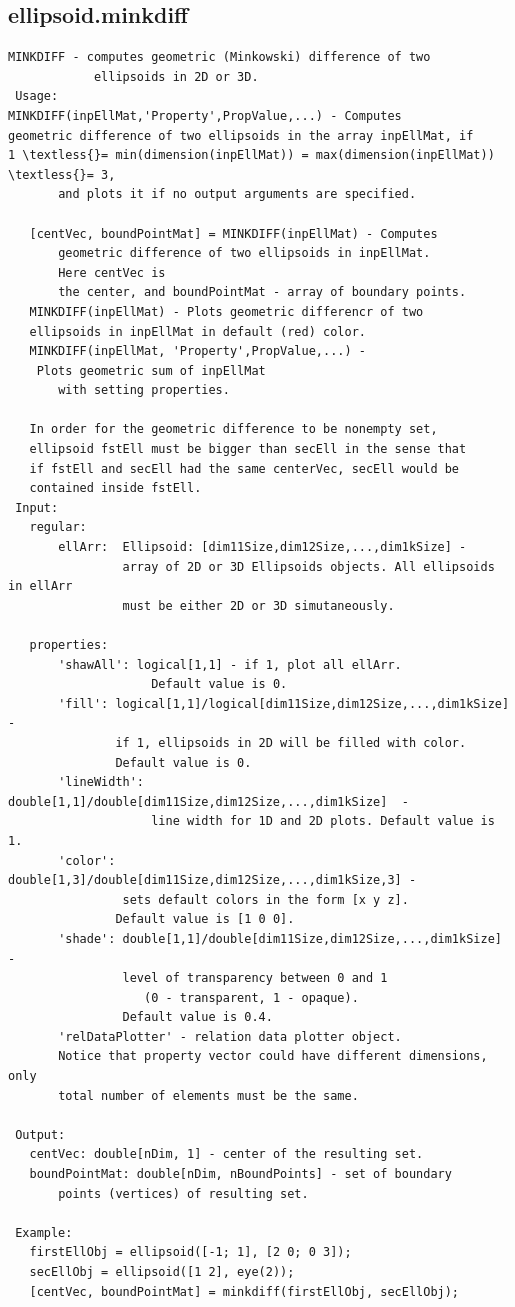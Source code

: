 \documentclass[letterpaper,10pt,english]{sphinxmanual}
\begin{document}
\subsection{ellipsoid.minkdiff}
\label{chap_functions:ellipsoid-minkdiff}
\begin{Verbatim}[commandchars=\\\{\}]
MINKDIFF - computes geometric (Minkowski) difference of two
            ellipsoids in 2D or 3D.
 Usage:
MINKDIFF(inpEllMat,'Property',PropValue,...) - Computes
geometric difference of two ellipsoids in the array inpEllMat, if
1 \textless{}= min(dimension(inpEllMat)) = max(dimension(inpEllMat)) \textless{}= 3,
       and plots it if no output arguments are specified.

   [centVec, boundPointMat] = MINKDIFF(inpEllMat) - Computes
       geometric difference of two ellipsoids in inpEllMat.
       Here centVec is
       the center, and boundPointMat - array of boundary points.
   MINKDIFF(inpEllMat) - Plots geometric differencr of two
   ellipsoids in inpEllMat in default (red) color.
   MINKDIFF(inpEllMat, 'Property',PropValue,...) -
    Plots geometric sum of inpEllMat
       with setting properties.

   In order for the geometric difference to be nonempty set,
   ellipsoid fstEll must be bigger than secEll in the sense that
   if fstEll and secEll had the same centerVec, secEll would be
   contained inside fstEll.
 Input:
   regular:
       ellArr:  Ellipsoid: [dim11Size,dim12Size,...,dim1kSize] -
                array of 2D or 3D Ellipsoids objects. All ellipsoids in ellArr
                must be either 2D or 3D simutaneously.

   properties:
       'shawAll': logical[1,1] - if 1, plot all ellArr.
                    Default value is 0.
       'fill': logical[1,1]/logical[dim11Size,dim12Size,...,dim1kSize]  -
               if 1, ellipsoids in 2D will be filled with color.
               Default value is 0.
       'lineWidth': double[1,1]/double[dim11Size,dim12Size,...,dim1kSize]  -
                    line width for 1D and 2D plots. Default value is 1.
       'color': double[1,3]/double[dim11Size,dim12Size,...,dim1kSize,3] -
                sets default colors in the form [x y z].
               Default value is [1 0 0].
       'shade': double[1,1]/double[dim11Size,dim12Size,...,dim1kSize]  -
                level of transparency between 0 and 1
                   (0 - transparent, 1 - opaque).
                Default value is 0.4.
       'relDataPlotter' - relation data plotter object.
       Notice that property vector could have different dimensions, only
       total number of elements must be the same.

 Output:
   centVec: double[nDim, 1] - center of the resulting set.
   boundPointMat: double[nDim, nBoundPoints] - set of boundary
       points (vertices) of resulting set.

 Example:
   firstEllObj = ellipsoid([-1; 1], [2 0; 0 3]);
   secEllObj = ellipsoid([1 2], eye(2));
   [centVec, boundPointMat] = minkdiff(firstEllObj, secEllObj);
\end{Verbatim}
\end{document}
